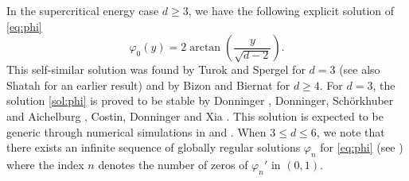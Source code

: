 \documentclass[11pt]{aims}
\theoremstyle{definition}
\numberwithin{equation}{section}
\begin{document}
In the supercritical energy case $d \geq 3$, we have the following explicit solution of \eqref{eq:phi}
\begin{equation}\label{sol:phi}
\varphi_0(y) = 2 \arctan \left(\frac{y}{\sqrt{d - 2}}\right).
\end{equation}
This self-similar solution was found by Turok and Spergel \cite{TSprl90} for $d = 3$ (see also Shatah \cite{Scpam88} for an earlier result) and by Bizon and Biernat \cite{BBcmp15} for $d \geq 4$. For $d = 3$, the solution \eqref{sol:phi} is proved to be stable by Donninger \cite{Dcpam11}, Donninger, Sch\"orkhuber and Aichelburg \cite{DSAihp12}, Costin, Donninger and Xia \cite{CDXnon16}. This solution is expected to be generic through numerical simulations in \cite{BCTnon00} and \cite{BBcmp15}. When $3 \leq d \leq 6$, we note that there exists an infinite sequence of globally regular solutions $\varphi_n$ for \eqref{eq:phi} (see \cite{BBMnon17}) where the index $n$ denotes the number of zeros of $\varphi_n'$ in $(0,1)$.  
\end{document}
